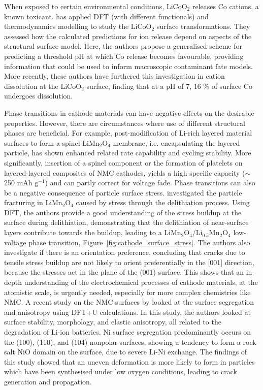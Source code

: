 \documentclass[../main.tex]{subfiles}
\begin{document}
When exposed to certain environmental conditions, LiCoO$_2$ releases Co cations, a known toxicant. \citeauthor{abbaspour2020dft} has applied DFT (with different functionals) and thermodynamics modelling to study the LiCoO$_2$ surface transformations. \cite{abbaspour2020dft} They assessed how the calculated predictions for ion release depend on aspects of the structural surface model. Here, the authors propose a generalised scheme for predicting a threshold pH at which Co release becomes favourable, providing information that could be used to inform macroscopic contaminant fate models. More recently, these authors have furthered this investigation in cation dissolution at the LiCoO$_2$ surface, finding that at a pH of 7, 16 \% of surface Co undergoes dissolution.\cite{abbaspour2020dft}

Phase transitions in cathode materials can have negative effects on the desirable properties. However, there are circumstances where use of different structural phases are beneficial. For example, post-modification of Li-rich layered material surfaces to form a spinel LiMn$_2$O$_4$ membrane, i.e. encapsulating the layered particle, has shown enhanced related rate capability and cycling stability.\cite{Ledwaba2020,deng2017layered,deng2016layered} More significantly, insertion of a spinel component\cite{long2014advances} or the formation of platelets\cite{wang2013nanoarchitecture} on layered-layered composites of NMC cathodes, yields a high specific capacity ($\sim$250 mAh g$^{-1}$) and can partly correct for voltage fade.\cite{Ledwaba2020} Phase transitions can also be a negative consequence of particle surface stress. \citeauthor{warburton2020oriented} investigated the particle fracturing in LiMn$_2$O$_4$ caused by stress through the delithiation process.\cite{warburton2020oriented} Using DFT, the authors provide a good understanding of the stress buildup at the surface during delithiation, demonstrating that the delithiation of near-surface layers contribute towards the buildup, leading to a LiMn$_2$O$_4$/Li$_{0.5}$Mn$_2$O$_4$ low-voltage phase transition, Figure~\ref{fig:cathode_surface_stress}. The authors also investigate if there is an orientation preference, concluding that cracks due to tensile stress buildup are not likely to orient preferentially in the [001] direction, because the stresses act in the plane of the (001) surface.\cite{warburton2020oriented} This shows that an in-depth understanding of the electrochemical processes of cathode materials, at the atomistic scale, is urgently needed, especially for more complex chemistries like NMC. A recent study on the NMC surfaces by \citeauthor{liang2018ab} looked at the surface segregation and anisotropy using DFT+U calculations.\cite{liang2018ab} In this study, the authors looked at surface stability, morphology, and elastic anisotropy, all related to the degradation of Li-ion batteries. Ni surface segregation predominantly occurs on the (100), (110), and (104) nonpolar surfaces, showing a tendency to form a rock-salt NiO domain on the surface, due to severe Li-Ni exchange. The findings of this study showed that an uneven deformation is more likely to form in particles which have been synthesised under low oxygen conditions, leading to crack generation and propagation.\cite{liang2018ab}
\end{document}
